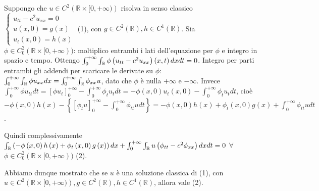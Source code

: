\documentclass{article}
\begin{document}
Suppongo che $u\in C^{2}\left( 
\mathbb{R}
\times \lbrack 0,+\infty )\right) $ risolva in senso classico $\left\{ 
\begin{array}{c}
u_{tt}-c^{2}u_{xx}=0 \\ 
u\left( x,0\right) =g\left( x\right) \\ 
u_{t}\left( x,0\right) =h\left( x\right)%
\end{array}%
\right. $ (1), con $g\in C^{2}\left( 
\mathbb{R}
\right) ,h\in C^{1}\left( 
\mathbb{R}
\right) $. Sia $\phi \in C_{0}^{2}\left( 
\mathbb{R}
\times \lbrack 0,+\infty \right) )$: moltiplico entrambi i lati
dell'equazione per $\phi $ e integro in spazio e tempo. Ottengo $%
\int_{0}^{+\infty }\int_{%
\mathbb{R}
}\phi \left( u_{tt}-c^{2}u_{xx}\right) \left( x,t\right) dxdt=0$. Integro
per parti entrambi gli addendi per scaricare le derivate su $\phi $: $%
\int_{0}^{+\infty }\int_{%
\mathbb{R}
}\phi u_{xx}dx=\int_{0}^{+\infty }\int_{%
\mathbb{R}
}\phi _{xx}u$, dato che $\phi $ \`{e} nulla $+\infty $ e $-\infty $. Invece $%
\int_{0}^{+\infty }\phi u_{tt}dt=\left[ \phi u_{t}\right] _{0}^{+\infty
}-\int_{0}^{+\infty }\phi _{t}u_{t}dt=-\phi \left( x,0\right) u_{t}\left(
x,0\right) -\int_{0}^{+\infty }\phi _{t}u_{t}dt$, cio\`{e} $-\phi \left(
x,0\right) h\left( x\right) -\left\{ \left[ \phi _{t}u\right] _{0}^{+\infty
}-\int_{0}^{+\infty }\phi _{tt}udt\right\} =-\phi \left( x,0\right) h\left(
x\right) +\phi _{t}\left( x,0\right) g\left( x\right) +\int_{0}^{+\infty
}\phi _{tt}udt$.

Quindi complessivamente $\int_{%
\mathbb{R}
}\left( -\phi \left( x,0\right) h\left( x\right) +\phi _{t}\left( x,0\right)
g\left( x\right) \right) dx+\int_{0}^{+\infty }\int_{%
\mathbb{R}
}u\left( \phi _{tt}-c^{2}\phi _{xx}\right) dxdt=0$ $\forall $ $\phi \in
C_{0}^{2}\left( 
\mathbb{R}
\times \lbrack 0,+\infty \right) )$ (2).

Abbiamo dunque mostrato che se $u$ \`{e} una soluzione classica di (1), con $%
u\in C^{2}\left( 
\mathbb{R}
\times \lbrack 0,+\infty )\right) ,g\in C^{2}\left( 
\mathbb{R}
\right) ,h\in C^{1}\left( 
\mathbb{R}
\right) $, allora vale (2).
\end{document}

